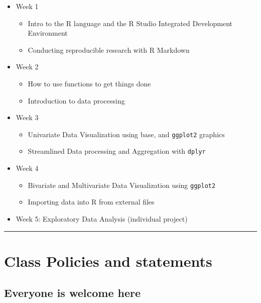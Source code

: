 \documentclass[
  11pt,
]{article}
\providecommand{\tightlist}{%
  \setlength{\itemsep}{0pt}\setlength{\parskip}{0pt}}
\begin{document}
\begin{itemize}
\tightlist
\item
  Week 1

  \begin{itemize}
  \tightlist
  \item
    Intro to the R language and the R Studio Integrated Development
    Environment
  \item
    Conducting reproducible research with R Markdown
  \end{itemize}
\item
  Week 2

  \begin{itemize}
  \tightlist
  \item
    How to use functions to get things done
  \item
    Introduction to data processing
  \end{itemize}
\item
  Week 3

  \begin{itemize}
  \tightlist
  \item
    Univariate Data Visualization using base, and \texttt{ggplot2}
    graphics
  \item
    Streamlined Data processing and Aggregation with \texttt{dplyr}
  \end{itemize}
\item
  Week 4

  \begin{itemize}
  \tightlist
  \item
    Bivariate and Multivariate Data Visualization using \texttt{ggplot2}
  \item
    Importing data into R from external files
  \end{itemize}
\item
  Week 5: Exploratory Data Analysis (individual project)
\end{itemize}

\begin{center}\rule{0.5\linewidth}{0.5pt}\end{center}

\hypertarget{class-policies-and-statements}{%
\section{Class Policies and
statements}\label{class-policies-and-statements}}

\hypertarget{everyone-is-welcome-here}{%
\subsection{Everyone is welcome here}\label{everyone-is-welcome-here}}
\end{document}
